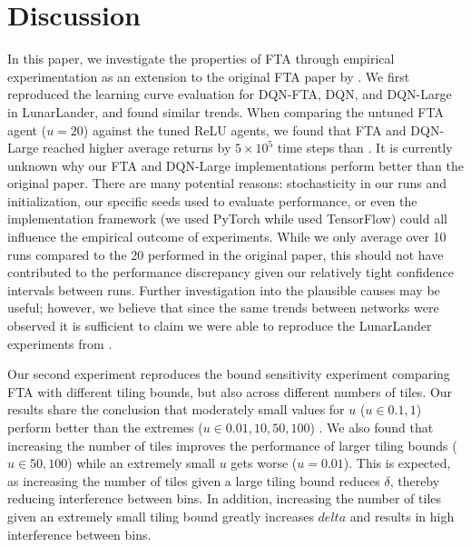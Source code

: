 \documentclass{article}
\begin{document}
\section{Discussion} \label{sec:discussion}
In this paper, we investigate the properties of FTA through empirical experimentation as an extension to the original FTA paper by \cite[]{pan2019fuzzy}.
We first reproduced the learning curve evaluation for DQN-FTA, DQN, and DQN-Large in LunarLander, and found similar trends. When comparing the untuned FTA agent ($u = 20$) against the tuned ReLU agents, we found that FTA and DQN-Large reached higher average returns by $5\times10^5$ time steps than \cite{pan2019fuzzy}. 
It is currently unknown why our FTA and DQN-Large implementations perform better than the original paper. 
There are many potential reasons: stochasticity in our runs and initialization, our specific seeds used to evaluate performance, or even the implementation framework (we used PyTorch while \cite{pan2019fuzzy} used TensorFlow) could all influence the empirical outcome of experiments. 
While we only average over 10 runs compared to the 20 performed in the original paper, this should not have contributed to the performance discrepancy given our relatively tight confidence intervals between runs. 
Further investigation into the plausible causes may be useful; however, we believe that since the same trends between networks were observed it is sufficient to claim we were able to reproduce the LunarLander experiments from \cite[]{pan2019fuzzy}.

Our second experiment reproduces the bound sensitivity experiment comparing FTA with different tiling bounds, but also across different numbers of tiles. 
Our results share the conclusion that moderately small values for $u$ ($u \in {0.1, 1}$) perform better than the extremes ($u \in {0.01, 10, 50, 100}$) \cite[]{pan2019fuzzy}. 
We also found that increasing the number of tiles improves the performance of larger tiling bounds ($u \in {50, 100}$) while an extremely small $u$ gets worse ($u = 0.01$). 
This is expected, as increasing the number of tiles given a large tiling bound reduces $\delta$, thereby reducing interference between bins. 
In addition, increasing the number of tiles given an extremely small tiling bound greatly increases $delta$ and results in high interference between bins.
\end{document}
